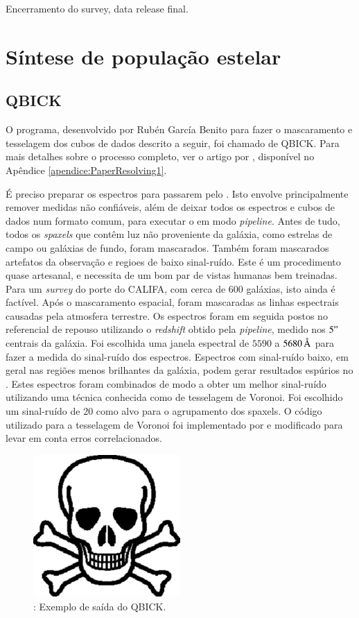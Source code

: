 \TODO Encerramento do survey, data release final.

\section{Síntese de população estelar}

\subsection{QBICK}

O programa, desenvolvido por Rubén García Benito para fazer o mascaramento e
tesselagem dos cubos de dados descrito a seguir, foi chamado de QBICK. Para mais
detalhes sobre o processo completo, ver o artigo por \citet{CidFernandes2013a},
disponível no Apêndice \ref{apendice:PaperResolving1}.

É preciso preparar os espectros para passarem pelo \starlight. Isto envolve
principalmente remover medidas não confiáveis, além de deixar todos os espectros
e cubos de dados num formato comum, para executar o \starlight em modo {\em
pipeline}. Antes de tudo, todos os {\em spaxels} que contêm luz não proveniente
da galáxia, como estrelas de campo ou galáxias de fundo, foram mascarados.
Também foram mascarados artefatos da observação e regioes de baixo sinal-ruído.
Este é um procedimento quase artesanal, e necessita de um bom par de vistas
humanas bem treinadas. Para um {\em survey} do porte do CALIFA, com cerca de 600
galáxias, isto ainda é factível. Após o mascaramento espacial, foram mascaradas
as linhas espectrais causadas pela atmosfera terrestre. Os espectros foram em
seguida postos no referencial de repouso utilizando o {\em redshift} obtido pela
{\em pipeline}, medido nos $5"$ centrais da galáxia. Foi escolhida uma janela
espectral de $5590$ a $5680\,\text{\normalfont\AA}$ para fazer a medida do sinal-ruído dos
espectros. Espectros com sinal-ruído baixo, em geral nas regiões menos
brilhantes da galáxia, podem gerar resultados espúrios no \starlight. Estes
espectros foram combinados de modo a obter um melhor sinal-ruído utilizando uma
técnica conhecida como de tesselagem de Voronoi. Foi escolhido um sinal-ruído de
20 como alvo para o agrupamento dos spaxels. O código utilizado para a
tesselagem de Voronoi foi implementado por \citet{Cappellari2003} e modificado
para levar em conta erros correlacionados.

\begin{figure}
	\includegraphics[width=0.5\textwidth]{figuras/test.pdf}
	\caption[Exemplo de saída do QBICK.]
	{\TODO: Exemplo de saída do QBICK.}
	\label{fig:QBICK}
\end{figure}

